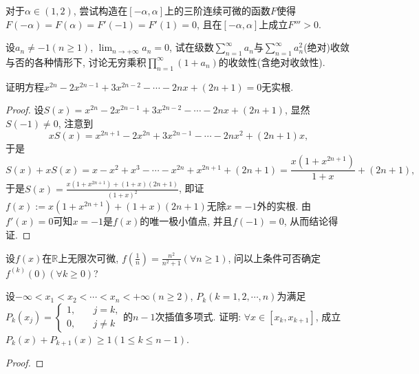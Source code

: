 \begin{quizb}
\woe 对于\(\alpha\in (1,2)\), 尝试构造在\([-\alpha,\alpha]\)上的三阶连续可微的函数\(F\)使得\(F(-\alpha)=F(\alpha)=F'(-1)=F'(1)=0\), 且在\([-\alpha,\alpha]\)上成立\(F'''>0.\)
\begin{solution}

\end{solution}
\woe 设\(a_n\ne -1(n\geqslant 1)\), \(\lim_{n\rightarrow+\infty}a_n=0\), 试在级数\(\sum_{n=1}^{\infty}a_n\)与\(\sum_{n=1}^{\infty}a_n^2\)(绝对)收敛与否的各种情形下, 讨论无穷乘积\(\prod_{n=1}^{\infty}(1+a_n)\)的收敛性(含绝对收敛性).
\begin{solution}

\end{solution}
\woe 证明方程\(x^{2n}-2x^{2n-1}+3x^{2n-2}-\cdots-2nx+(2n+1)=0\)无实根.
\begin{proof}
设\(S(x)=x^{2n}-2x^{2n-1}+3x^{2n-2}-\cdots-2nx+(2n+1)\), 显然\(S(-1)\ne 0\), 注意到\[xS(x)=x^{2n+1}-2x^{2n}+3x^{2n-1}-\cdots-2nx^2+(2n+1)x,\]于是\[S(x)+xS(x)=x-x^2+x^3-\cdots-x^{2n}+x^{2n+1}+(2n+1)=\frac{x\left(1+x^{2n+1}\right)}{1+x}+(2n+1),\]于是\(S(x)=\frac{x(1+x^{2n+1})+(1+x)(2n+1)}{(1+x)^2}\), 即证\(f(x):=x(1+x^{2n+1})+(1+x)(2n+1)\)无除\(x=-1\)外的实根. 由\(f'(x)=0\)可知\(x=-1\)是\(f(x)\)的唯一极小值点, 并且\(f(-1)=0\), 从而结论得证.
\end{proof}
\woe 设\(f(x)\)在\(\mathbb{R}\)上无限次可微, \(f\left(\frac{1}{n}\right)=\frac{n^2}{n^2+1}(\forall n\geqslant1)\), 问以上条件可否确定\(f^{(k)}(0)(\forall k\geqslant 0)\)?
\begin{solution}

\end{solution}
\woe 设\(-\infty<x_1<x_2<\cdots<x_n<+\infty(n\geqslant 2)\), \(P_k(k=1,2,\cdots,n)\)为满足\(P_k(x_j)=\begin{cases}
1,\quad&j=k,\\0,&j\ne k
\end{cases}\)的\(n-1\)次插值多项式. 证明: \(\forall x\in[x_k,x_{k+1}]\), 成立\(P_k(x)+P_{k+1}(x)\geqslant 1(1\leqslant k\leqslant n-1)\).
\begin{proof}
	
\end{proof}
\end{quizb}
